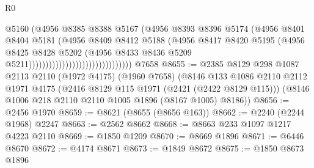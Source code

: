 \begin{lexlean}{R0}
\begin{coremodule}
                                                    @5160
                                                    (@4956
                                                      @8385
                                                      @8388
                                                      @5167
                                                      (@4956
                                                        @8393
                                                        @8396
                                                        @5174
                                                        (@4956
                                                          @8401
                                                          @8404
                                                          @5181
                                                          (@4956
                                                            @8409
                                                            @8412
                                                            @5188
                                                            (@4956
                                                              @8417
                                                              @8420
                                                              @5195
                                                              (@4956
                                                                @8425
                                                                @8428
                                                                @5202
                                                                (@4956
                                                                  @8433
                                                                  @8436
                                                                  @5209
                                                                  @5211)))))))))))))))))))))))))))))))
    @7658
@8655 := @2385
    @8129
    @298
    @1087
    @2113
    @2110
    (@1972 @4175)
    (@1960 @7658)
    (@8146
      @133
      @1086
      @2110
      @2112
      @1971
      @4175
      (@2416 @8129 @115 @1971 (@2421 (@2422 @8129 @115)))
      (@8146 @1006 @218 @2110 @2110 @1005 @1896 (@8167 @1005) @8186))
@8656 := @2456 @1970
@8659 := @8621 (@8655 (@8656 @163))
@8662 := @2240 (@2244 @1968) @2247
@8663 := @2562 @8662
@8668 := @8663 @233 @1097 @1217 @4223 @2110
@8669 := @1850 @1209
@8670 := @8669 @1896
@8671 := @6446 @8670
@8672 := @4174 @8671
@8673 := @1849 @8672
@8675 := @1850 @8673 @1896

\end{coremodule}
\end{lexlean}
